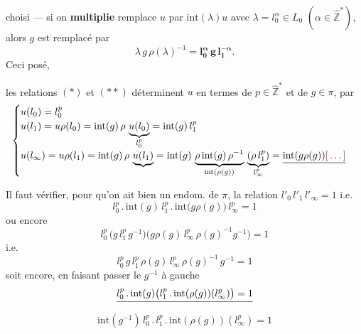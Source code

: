 \documentclass[11pt,a4paper]{article}
\begin{document}


choisi — si on \textbf{multiplie} remplace $u$ par $\mathrm{int}(\lambda)u$
avec $\lambda = l_0^{\alpha} \in L_0$ $(\alpha \in \hat{\mathbb{Z}}^{*})$, alors $g$
est remplacé par
\[
\lambda\, g\, \rho(\lambda)^{-1} = \mathbf{l_0^{\alpha}\, g\, l_1^{-\alpha}}.
\]
Ceci posé,

les relations $(*)$ et $(**)$ déterminent $u$ en termes de
$p \in \hat{\mathbb{Z}}^{*}$ et de $g \in \pi$, par
\[
\begin{cases}
u(l_0) = l_0^{p} \\
u(l_1) = u\rho(l_0) = \mathrm{int}(g)\,\rho\, \underbrace{u(l_0)}_{l_0^{p}} = \mathrm{int}(g)\, l_1^{p} \\
u(l_\infty) = u\rho(l_1) = \mathrm{int}(g)\, \rho\, \underbrace{u(l_1)} = \mathrm{int}(g)\, \underbrace{\rho\, \mathrm{int}(g)\, \rho^{-1}}_{\mathrm{int}(\rho(g))}\, \underbrace{(\rho\, l_1^{p})}_{l_\infty^{p}} = \struck{\mathrm{int}(g\rho(g))\ill{}}
\end{cases}
\]




Il faut vérifier, pour qu'on ait bien un endom. de $\pi$, la relation
$l'_0\, l'_1\, l'_\infty = 1$ i.e.
\[
\boxed{l_0^{p}\,.\,\mathrm{int}(g)\, l_1^{p}\,.\,\mathrm{int}\bigl(g\rho(g)\bigr)\, l_\infty^{p} = 1}
\]
ou encore
\[
l_0^{p}\,\bigl(g\, l_1^{p}\, g^{-1}\bigr)\bigl(g\rho(g)\, l_\infty^{p}\, \rho(g)^{-1} g^{-1}\bigr) = 1
\]
i.e.
\[
l_0^{p}\, g\, l_1^{p}\, \rho(g)\, l_\infty^{p}\, \rho(g)^{-1}\, g^{-1} = 1
\]
soit encore, en faisant passer le $g^{-1}$ à gauche
\[
\struck{l_0^{p}\,.\,\mathrm{int}(g)\bigl(l_1^{p}\,.\,\mathrm{int}(\rho(g))(l_\infty^{p})\bigr) = 1}
\]
\[
\mathrm{int}(g^{-1})\, l_0^{p}\,.\, l_1^{p}\,.\,\mathrm{int}(\rho(g))(l_\infty^{p}) = 1
\]
\end{document}
